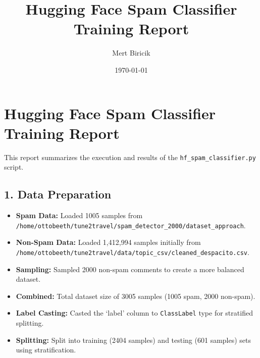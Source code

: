 \documentclass[a4paper,10pt]{article}
\title{Hugging Face Spam Classifier Training Report}
\author{Mert Biricik}
\date{\today}
\begin{document}
\maketitle
\section{Hugging Face Spam Classifier Training
Report}\label{hugging-face-spam-classifier-training-report}

This report summarizes the execution and results of the
\texttt{hf\_spam\_classifier.py} script.

\subsection{1. Data Preparation}\label{data-preparation}

\begin{itemize}
\tightlist
\item
  \textbf{Spam Data:} Loaded 1005 samples from
  \texttt{/home/ottobeeth/tune2travel/spam\_detector\_2000/dataset\_approach}.
\item
  \textbf{Non-Spam Data:} Loaded 1,412,994 samples initially from
  \texttt{/home/ottobeeth/tune2travel/data/topic\_csv/cleaned\_despacito.csv}.
\item
  \textbf{Sampling:} Sampled 2000 non-spam comments to create a more
  balanced dataset.
\item
  \textbf{Combined:} Total dataset size of 3005 samples (1005 spam, 2000
  non-spam).
\item
  \textbf{Label Casting:} Casted the `label' column to
  \texttt{ClassLabel} type for stratified splitting.
\item
  \textbf{Splitting:} Split into training (2404 samples) and testing
  (601 samples) sets using stratification.
\end{itemize}

\begin{Shaded}
\begin{Highlighting}[]
\end{Highlighting}
\end{Shaded}
\end{document}
